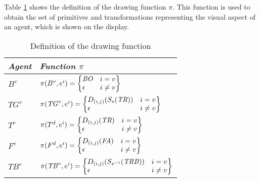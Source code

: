 \documentclass[runningheads]{llncs}
\begin{document}
Table \ref{table5} shows the definition of the drawing function $\pi$. This function is used to obtain the set of primitives and transformations representing the visual aspect of an agent, which is shown on the display.


\begin{table}[h]
\begin{center}
\begin{small}
\begin{tabular}{|l|l|}

    \hline \itshape Agent & \itshape Function ${\pi}$ \\
    \hline
    $B^{v}$ &
    $\pi (B^{v},e^{i})=\left\{\begin{matrix}\mathit{BO}\hfill\null
        &i=v\hfill\null \\\epsilon \hfill\null &i\neq v\hfill\null
        \end{matrix}\right\}$   \\

    \hline
    $TG^{v}$ &
    $\pi (\mathit{TG}^{v},e^{i})=\left\{\begin{matrix}D_{(i,j)}(S_{s}(\mathit{TR}))\hfill\null
        &i=v\hfill\null \\\epsilon \hfill\null &i\neq v\hfill\null
        \end{matrix}\right\}$   \\

    \hline
    $T^{v}$ &
    $\pi(T^{d},e^{i})=\left\{\begin{matrix}D_{(i,j)}(\mathit{TR})\hfill\null
        &i=v\hfill\null \\\epsilon \hfill\null &i\neq v\hfill\null
        \end{matrix}\right\}$   \\

    \hline
    $F^{v}$ &
    $\pi(F^{d},e^{i})=\left\{\begin{matrix}D_{(i,j)}(\mathit{FA})\hfill\null
        &i=v\hfill\null \\\epsilon \hfill\null &i\neq v\hfill\null
        \end{matrix}\right\}$   \\

    \hline
    $TB^{v}$ &
    $\pi(\mathit{TB}^{v},e^{i})=\left\{\begin{matrix}D_{(i,j)}(S_{s^{-1}}(\mathit{TRB}))\hfill\null
        &i=v\hfill\null \\\epsilon \hfill\null &i\neq v\hfill\null
        \end{matrix}\right\}$   \\

    \hline
\end{tabular}
\end{small}
\caption{\label{table5} Definition of the drawing function}
\end{center}
\end{table}
\end{document}
